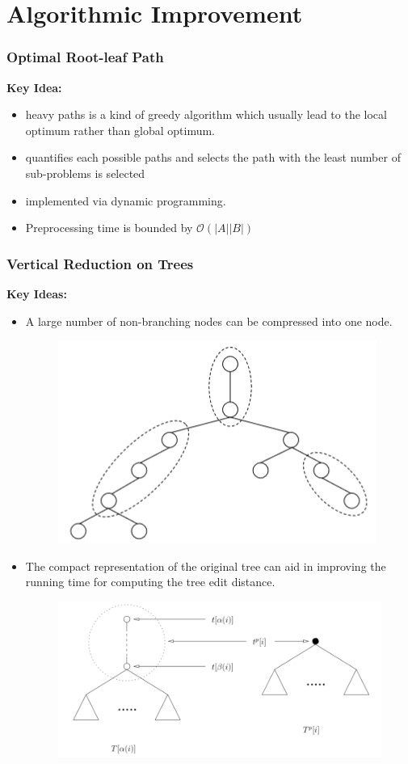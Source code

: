 \documentclass{beamer}
\begin{document}
\section{Algorithmic Improvement}
\begin{frame}
\frametitle{Optimal Root-leaf Path}
\textbf{Key Idea:}
\begin{itemize}
\item heavy paths is a kind of greedy algorithm which usually lead to the local optimum rather than global optimum.
\item quantifies each possible paths and selects the path with the least number of sub-problems is selected
\item implemented via dynamic programming.
\item Preprocessing time  is bounded by $\mathcal{O}(\left\vert A \right\vert \left\vert B \right\vert)$
\end{itemize}
\end{frame}
\begin{frame}
\frametitle{Vertical Reduction on Trees}
\textbf{Key Ideas:}

\begin{itemize}
\item A large number of non-branching nodes can be compressed into one node.
\begin{figure}
	\includegraphics[width=0.4\linewidth]{VComponent}
	\centering
\end{figure}
\item The compact representation of the original tree can aid in improving the running time for computing the tree edit distance.
\begin{figure}
	\includegraphics[width=0.5\linewidth]{VReduction}
	\centering
\end{figure}
\end{itemize}
\end{frame}
\end{document}
